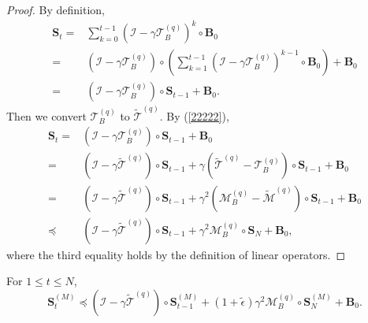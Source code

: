 \documentclass[11pt, letterpaper]{article}
\begin{document}
\begin{proof}
    By definition,
    \begin{equation}
        \label{22222}
        \begin{aligned}
            \mathbf{S}_t=&\sum_{k=0}^{t-1}(\mathcal{I}-\gamma\mathcal{T}_B^{(q)})^k\circ\mathbf{B}_0\\
            =&(\mathcal{I}-\gamma\mathcal{T}_B^{(q)})\circ\left(\sum_{k=1}^{t-1}(\mathcal{I}-\gamma\mathcal{T}_B^{(q)})^{k-1}\circ\mathbf{B}_0\right)+\mathbf{B}_0\\
            =&(\mathcal{I}-\gamma\mathcal{T}_B^{(q)})\circ\mathbf{S}_{t-1}+\mathbf{B}_0.
        \end{aligned}
    \end{equation}
    Then we convert $\mathcal{T}_B^{(q)}$ to $\widetilde{\mathcal{T}}^{(q)}$. By (\ref{22222}),
    \begin{equation*}
        \begin{aligned}
            \mathbf{S}_{t} =& (\mathcal{I}-\gamma\mathcal{T}_B^{(q)})\circ\mathbf{S}_{t-1}+\mathbf{B}_0\\
            =& (\mathcal{I}-\gamma\widetilde{\mathcal{T}}^{(q)})\circ\mathbf{S}_{t-1}+\gamma (\widetilde{\mathcal{T}}^{(q)}-{\mathcal{T}}_B^{(q)})\circ\mathbf{S}_{t-1}+\mathbf{B}_0\\
            =& (\mathcal{I}-\gamma\widetilde{\mathcal{T}}^{(q)})\circ\mathbf{S}_{t-1}+\gamma^2 ({\mathcal{M}}_B^{(q)}-\widetilde{\mathcal{M}}^{(q)})\circ\mathbf{S}_{t-1}+\mathbf{B}_0\\
            \preceq&(\mathcal{I}-\gamma\tilde{\mathcal{T}}^{(q)})\circ\mathbf{S}_{t-1}+\gamma^{2}\mathcal{M}_B^{(q)}\circ\mathbf{S}_{N}+\mathbf{B}_{0},
        \end{aligned}
    \end{equation*}
    where the third equality holds by the definition of linear operators.
\end{proof}
\begin{lemma}
\label{(Initial Study of $S_t$) mu}
    For $1 \leq t\leq N$,
    \begin{equation*}           
        \mathbf{S}_{t}^{(M)}\preceq(\mathcal{I}-\gamma\tilde{\mathcal{T}}^{(q)})\circ\mathbf{S}_{t-1}^{(M)}+(1+\tilde{\epsilon})\gamma^{2}\mathcal{M}_B^{(q)}\circ\mathbf{S}_{N}^{(M)}+\mathbf{B}_{0}.
    \end{equation*}
\end{lemma}
\end{document}
